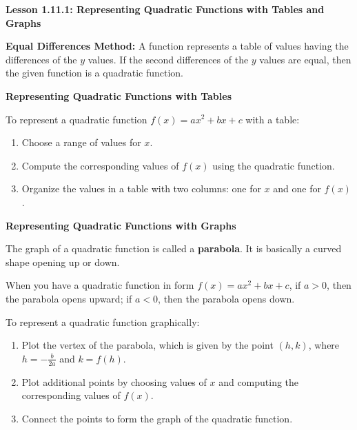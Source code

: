 \begin{center}
\textbf{Lesson 1.11.1: Representing Quadratic Functions with Tables and Graphs}
\end{center}

\vspace*{1ex}

\textbf{Equal Differences Method:} A function represents a table of values having the differences of the $y$ values. If the second differences of the $y$ values are equal, then the given function is a quadratic function. 

\textbf{Representing Quadratic Functions with Tables}

To represent a quadratic function $f(x) = ax^2 + bx + c$ with a table:
\begin{enumerate}[label = \color{blue}\arabic*. ]
    \item Choose a range of values for $x$.
    \item Compute the corresponding values of $f(x)$ using the quadratic function.
    \item Organize the values in a table with two columns: one for $x$ and one for $f(x)$.
\end{enumerate}

\textbf{Representing Quadratic Functions with Graphs}

The graph of a quadratic function is called a \textbf{parabola}. It is basically a curved shape opening up or down. 

When you have a quadratic function in form $f(x) = ax^2 + bx + c$, if $a > 0$, then the parabola opens upward; if $a < 0$, then the parabola opens down. 

To represent a quadratic function graphically:
\begin{enumerate}[label = \color{blue}\arabic*. ]
    \item Plot the vertex of the parabola, which is given by the point $(h, k)$, where $h = -\frac{b}{2a}$ and $k = f(h)$.
    \item Plot additional points by choosing values of $x$ and computing the corresponding values of $f(x)$.
    \item Connect the points to form the graph of the quadratic function.
\end{enumerate}



